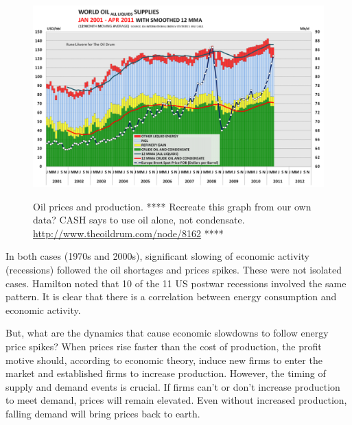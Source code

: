 \begin{figure}[!ht]
\centering\
\includegraphics[width=\linewidth]{Part_0/Chapter_Introduction/images/Oil_Prices.pdf}
\caption[Oil prices and production]{Oil prices and production.
**** Recreate this graph from our own data? CASH says to use oil alone, not condensate. \url{http://www.theoildrum.com/node/8162} ****} 
\label{fig:oils_prices_and_production}
\end{figure}

In both cases (1970s and 2000s), 
significant slowing of economic activity (recessions)
followed the oil shortages and prices spikes.
These were not isolated cases.
Hamilton noted that 
10 of the 11 US postwar recessions 
involved the same pattern.\cite[p.~45]{Hamilton:2013vc}
It is clear that 
there is a correlation between energy consumption and economic activity.

But, what are the dynamics that cause economic slowdowns 
to follow energy price spikes?
When prices rise faster than the cost of production, 
the profit motive should, according to economic theory, induce 
new firms to enter the market and
established firms to increase production.
However, the timing of supply and demand events is crucial.
If firms can't or don't increase production to meet demand, 
prices will remain elevated.
Even without increased production, falling demand will 
bring prices back to earth.

